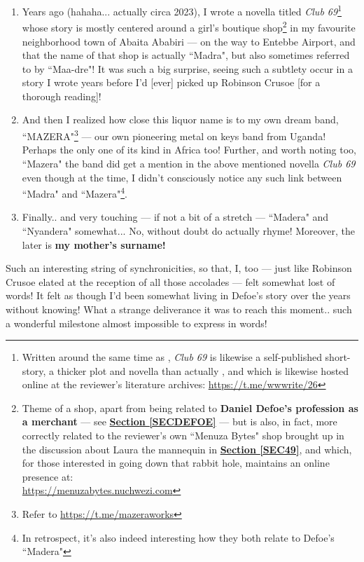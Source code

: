 \documentclass[a4paper]{article}
\begin{document}
\begin{enumerate}
\item  Years ago (hahaha... actually circa 2023), I wrote a novella titled \textit{Club 69}\footnote{Written around the same time as \cite{lutalo_embaga_rina}, \textit{Club 69} is likewise a self-published short-story, a thicker plot and novella than actually \cite{lutalo_embaga_rina}, and which is likewise hosted online at the reviewer's literature archives: \url{https://t.me/wwwrite/26}} whose story is mostly centered around a girl's boutique shop\footnote{Theme of a shop, apart from being related to \textbf{Daniel Defoe's profession as a merchant} --- see \textbf{\hyperref[SECDEFOE]{Section \ref{SECDEFOE}}} --- but is also, in fact, more correctly related to the reviewer's own ``Menuza Bytes" shop brought up in the discussion about Laura the mannequin in \textbf{\hyperref[SEC49]{Section \ref{SEC49}}}, and which, for those interested in going down that rabbit hole, maintains an online presence at:\\ \url{https://menuzabytes.nuchwezi.com}} in my favourite neighborhood town of Abaita Ababiri --- on the way to Entebbe Airport, and that the name of that shop is actually ``Madra", but also sometimes referred to by ``Maa-dre"! It was such a big surprise, seeing such a subtlety occur in a story I wrote years before I'd [ever] picked up Robinson Crusoe [for a thorough reading]!

\item And then I realized how close this liquor name is to my own dream band, ``MAZERA"\footnote{Refer to \url{https://t.me/mazeraworks}} --- our own pioneering metal on keys band from Uganda! Perhaps the only one of its kind in Africa too! Further, and worth noting too, ``Mazera" the band did get a mention in the above mentioned novella \textit{Club 69} even though at the time, I didn't consciously notice any such link between ``Madra" and ``Mazera"\footnote{In retrospect, it's also indeed interesting how they both relate to Defoe's ``Madera"}.

\item Finally.. and very touching --- if not a bit of a stretch --- ``Madera" and ``Nyandera" somewhat... No, without doubt do actually rhyme! Moreover, the later is \textbf{my mother's surname!} 
\end{enumerate}


Such an interesting string of synchronicities, so that, I, too --- just like Robinson Crusoe elated at the reception of all those accolades --- felt somewhat lost of words! It felt as though I'd been somewhat living in Defoe's story over the years without knowing! What a strange deliverance it was to reach this moment.. such a wonderful milestone almost impossible to express in words!
\end{document}
